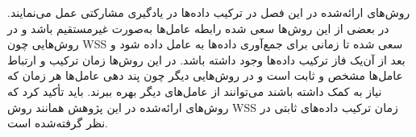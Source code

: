 روش‌های ارائه‌شده در این فصل در ترکیب داده‌ها در یادگیری مشارکتی عمل می‌نمایند. در بعضی از این روش‌ها سعی شده رابطه عامل‌ها به‌صورت غیرمستقیم باشد و در روش‌هایی چون WSS سعی شده تا زمانی برای جمع‌آوری داده‌ها به عامل داده شود و بعد از آن‌یک فاز ترکیب داده‌ها وجود داشته باشد. در این روش‌ها زمان ترکیب و ارتباط عامل‌ها مشخص و ثابت است و در روش‌هایی دیگر چون پند دهی عامل‌ها هر زمان که نیاز به کمک داشته باشند می‌توانند از عامل‌های دیگر بهره ببرند. باید تأکید کرد که روش‌های ارائه‌شده در این پژوهش همانند روش WSS زمان ترکیب داده‌های ثابتی در نظر گرفته‌شده است.

